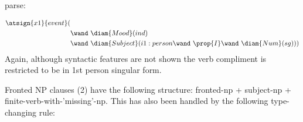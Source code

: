 parse:  
\vspace{-1.5em} %

\begin{align*}
\atsign{x1}{event}(&   \\ 
      & \wand\ \diam{Mood}(ind) \\
      & \wand\ \diam{Subject}(i1:person \wand\ \prop{I} \wand\ \diam{Num}(sg)) )
\end{align*}
Again, although syntactic features are not shown the verb compliment is restricted to be in 1st person singular form. 

Fronted NP clauses (2) have the following structure: fronted-np + subject-np + finite-verb-with-'missing'-np. This has also been handled by the following type-changing rule:
\vspace{-1.5em} %

